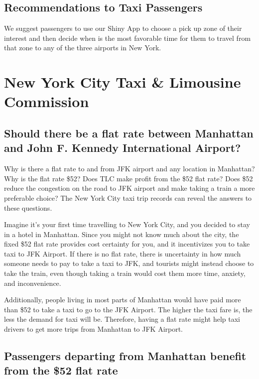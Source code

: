 \documentclass[12pt,twoside]{reedthesis}
\theoremstyle{definition}
\theoremstyle{definition}
\theoremstyle{definition}
\theoremstyle{remark}
\begin{document}
\section{Recommendations to Taxi
Passengers}\label{recommendations-to-taxi-passengers}

We suggest passengers to use our Shiny App to choose a pick up zone of
their interest and then decide when is the most favorable time for them
to travel from that zone to any of the three airports in New York.

\chapter{New York City Taxi \& Limousine Commission}\label{chapter5}

\section{Should there be a flat rate between Manhattan and John F.
Kennedy International
Airport?}\label{should-there-be-a-flat-rate-between-manhattan-and-john-f.-kennedy-international-airport}

Why is there a flat rate to and from JFK airport and any location in
Manhattan? Why is the flat rate \$52? Does TLC make profit from the \$52
flat rate? Does \$52 reduce the congestion on the road to JFK airport
and make taking a train a more preferable choice? The New York City taxi
trip records can reveal the answers to these questions.

Imagine it's your first time travelling to New York City, and you
decided to stay in a hotel in Manhattan. Since you might not know much
about the city, the fixed \$52 flat rate provides cost certainty for
you, and it incentivizes you to take taxi to JFK Airport. If there is no
flat rate, there is uncertainty in how much someone needs to pay to take
a taxi to JFK, and tourists might instead choose to take the train, even
though taking a train would cost them more time, anxiety, and
inconvenience.

Additionally, people living in most parts of Manhattan would have paid
more than \$52 to take a taxi to go to the JFK Airport. The higher the
taxi fare is, the less the demand for taxi will be. Therefore, having a
flat rate might help taxi drivers to get more trips from Manhattan to
JFK Airport.

\section{Passengers departing from Manhattan benefit from the \$52 flat
rate}\label{passengers-departing-from-manhattan-benefit-from-the-52-flat-rate}
\end{document}
